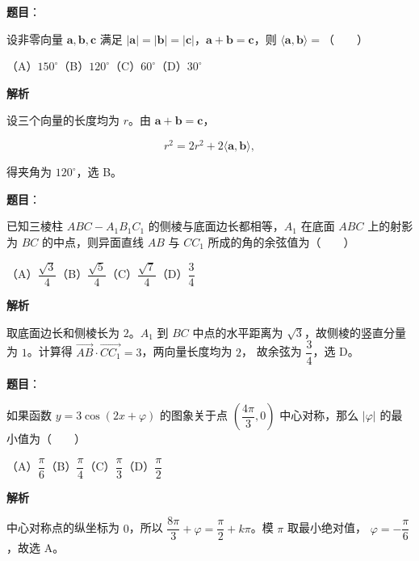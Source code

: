 \begin{answer}

\textbf{题目}：

设非零向量 $\boldsymbol a,\boldsymbol b,\boldsymbol c$ 满足 $|\boldsymbol a|=|\boldsymbol b|=|\boldsymbol c|$，$\boldsymbol a+\boldsymbol b=\boldsymbol c$，则 $\langle\boldsymbol a,\boldsymbol b\rangle=$\mbox{（　　）}

（A）$150^\circ$\quad（B）$120^\circ$\quad（C）$60^\circ$\quad（D）$30^\circ$

\textbf{解析}

设三个向量的长度均为 $r$。由 $\boldsymbol a+\boldsymbol b=\boldsymbol c$，

\nopagebreak[4]
\[
r^2=2r^2+2\langle\boldsymbol a,\boldsymbol b\rangle,
\]

得夹角为 $120^\circ$，选 B。


\end{answer}
\begin{answer}

\textbf{题目}：

已知三棱柱 $ABC-A_1B_1C_1$ 的侧棱与底面边长都相等，$A_1$ 在底面 $ABC$ 上的射影为 $BC$ 的中点，则异面直线 $AB$ 与 $CC_1$ 所成的角的余弦值为\mbox{（　　）}

（A）$\dfrac{\sqrt3}{4}$\quad（B）$\dfrac{\sqrt5}{4}$\quad（C）$\dfrac{\sqrt7}{4}$\quad（D）$\dfrac34$

\textbf{解析}

取底面边长和侧棱长为 $2$。$A_1$ 到 $BC$ 中点的水平距离为
$\sqrt3$，故侧棱的竖直分量为 $1$。计算得
$\overrightarrow{AB}\cdot\overrightarrow{CC_1}=3$，两向量长度均为 $2$，
故余弦为 $\dfrac34$，选 D。


\end{answer}
\begin{answer}

\textbf{题目}：

如果函数 $y=3\cos(2x+\varphi)$ 的图象关于点 $\left(\dfrac{4\pi}{3},0\right)$ 中心对称，那么 $|\varphi|$ 的最小值为\mbox{（　　）}

（A）$\dfrac\pi6$\quad（B）$\dfrac\pi4$\quad（C）$\dfrac\pi3$\quad（D）$\dfrac\pi2$

\textbf{解析}

中心对称点的纵坐标为 $0$，所以
$\dfrac{8\pi}{3}+\varphi=\dfrac\pi2+k\pi$。模 $\pi$ 取最小绝对值，
$\varphi=-\dfrac\pi6$，故选 A。


\end{answer}
